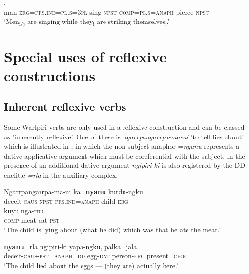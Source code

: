 \documentclass[output=paper]{../langscibook}
\begin{document}
\ea%
    \label{ex:laughren:39}
\gll [Wati-ngki=ka=lu  yunpa-rni]  [kujaka=lu=nyanu  panti-rni].\\
  man-\textsc{erg=prs.ind=pl.s=3pl}  sing-\textsc{npst}  \textsc{comp}\textsc{=pl.s=anaph}  pierce-\textsc{npst}\\
\glt `Men\textsubscript{i/j} are singing while they\textsubscript{i} are striking themselves\textsubscript{i}.'
\z

\section{Special uses of reflexive constructions}\label{sec:laughren:6}

\subsection{Inherent reflexive verbs}\label{sec:laughren:6.1}

Some Warlpiri verbs are only used in a reflexive construction and can be classed as 'inherently reflexive'. One of these is \textit{ngarrpangarrpa-ma-ni} 'to tell lies about' which is illustrated in , in which the non-subject anaphor =\textit{nyanu} represents a dative applicative argument which must be coreferential with the subject. In  the presence of an additional dative argument \textit{ngipiri-ki} is also registered by the DD enclitic \textit{=rla} in the auxiliary complex.

\ea%
    \label{ex:laughren:40}

\ea
\label{ex:laughren:40a}
\gll Ngarrpangarrpa-ma-ni  ka=\textbf{nyanu} {kurdu-ngku}\\
    deceit-\textsc{caus-npst}  \textsc{prs.ind=anaph}  child-\textsc{erg}\\

 {kuyu} {nga-rnu.}\\
    \textsc{comp}  meat  eat-\textsc{pst}\\
\glt `The child is lying about (what he did) which was that he ate the meat.'

\ex
\label{ex:laughren:40b}
\textbf{nyanu}=rla  ngipiri-ki  yapa-ngku,  palka=jala.\\
    deceit-\textsc{caus-pst=anaph=dd}  egg-\textsc{dat}  person-\textsc{erg}  present=\textsc{cfoc}\\

\glt `The child lied about the eggs — (they are) actually here.'
\z
\z
\end{document}
